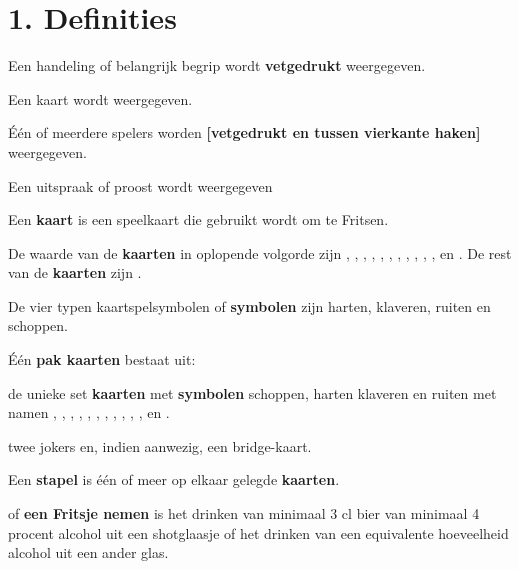 \newpage
\drawBar{}

\vspace{-0.5cm}
\section*{1. Definities}

\item Een handeling of belangrijk begrip wordt \textbf{vetgedrukt} weergegeven.

\item Een kaart wordt  weergegeven.

\item Één of meerdere spelers worden \textbf{[vetgedrukt en tussen vierkante haken]} weergegeven.

\item Een uitspraak of proost wordt  weergegeven 

\item Een \textbf{kaart} is een speelkaart die gebruikt wordt om te Fritsen.

\item \label{definitie:waarden_kaart} De waarde van de \textbf{kaarten} in oplopende volgorde zijn , , , , , , , , , , ,  en . De rest van de \textbf{kaarten} zijn .

\item De vier typen kaartspelsymbolen of \textbf{symbolen} zijn harten, klaveren, ruiten en schoppen. 

\item \label{definitie:kaarten} \'E\'en \textbf{pak kaarten} bestaat uit: 
    \puntLijst{}
        \item de unieke set \textbf{kaarten} met \textbf{symbolen} schoppen, harten klaveren en ruiten met namen , , , , , , , , , , ,  en .
        \item twee jokers en, indien aanwezig, een bridge-kaart.
    \eindPuntLijst{}

\item Een \textbf{stapel} is één of meer op elkaar gelegde \textbf{kaarten}.

\item \label{definitie:fritsen} \Fritsen of \textbf{een Fritsje nemen} is het drinken van minimaal 3 cl bier van minimaal 4 procent alcohol uit een shotglaasje of het drinken van een equivalente hoeveelheid alcohol uit een ander glas.


